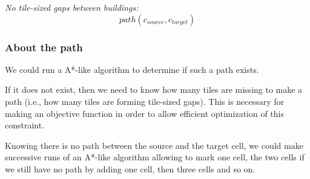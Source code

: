 \documentclass[11pt]{article}
\begin{document}
\noindent
{\em  No tile-sized gaps  between buildings:}
\begin{displaymath}
  path(c_{source}, c_{target})
\end{displaymath}

\subsubsection{About the path}

We  could  run  a  A*-like  algorithm  to determine  if  such  a  path
exists.

If it does not exist, then  we need to know how many tiles are
missing to  make a path (i.e.,  how many tiles  are forming tile-sized
gaps). This is necessary for  making an objective function in order to
allow efficient optimization of this constraint.

Knowing there  is no path between  the source and the  target cell, we
could make  successive runs of  an A*-like algorithm allowing  to mark
one cell, the two  cells if we still have no path  by adding one cell,
then three cells and so on.
\end{document}
